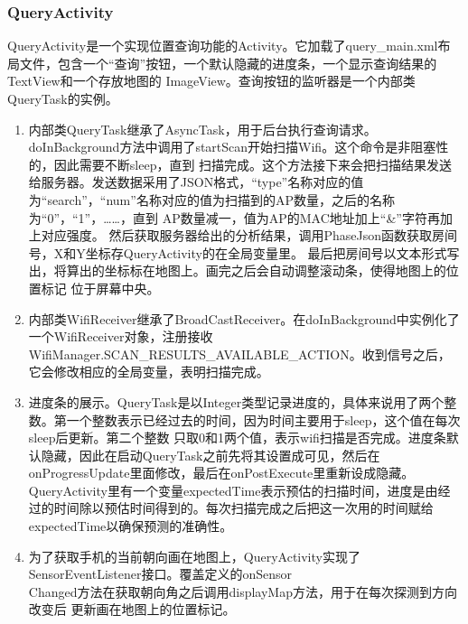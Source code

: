 \documentclass[a4paper,10pt]{article}
\begin{document}
\begin{CJK*}{UTF8}{gbsn}
    \subsubsection{QueryActivity}
    QueryActivity是一个实现位置查询功能的Activity。它加载了query\_main.xml布局文件，包含一个``查询''按钮，一个默认隐藏的进度条，一个显示查询结果的TextView和一个存放地图的
    ImageView。查询按钮的监听器是一个内部类QueryTask的实例。
    \begin{enumerate}[1)]
     \item 内部类QueryTask继承了AsyncTask，用于后台执行查询请求。doInBackground方法中调用了startScan开始扫描Wifi。这个命令是非阻塞性的，因此需要不断sleep，直到
     扫描完成。这个方法接下来会把扫描结果发送给服务器。发送数据采用了JSON格式，``type''名称对应的值为``search''，``num''名称对应的值为扫描到的AP数量，之后的名称为``0''，``1''，……，直到
     AP数量减一，值为AP的MAC地址加上``\&''字符再加上对应强度。
     然后获取服务器给出的分析结果，调用PhaseJson函数获取房间号，X和Y坐标存QueryActivity的在全局变量里。
     最后把房间号以文本形式写出，将算出的坐标标在地图上。画完之后会自动调整滚动条，使得地图上的位置标记
     位于屏幕中央。
     \item 内部类WifiReceiver继承了BroadCastReceiver。在doInBackground中实例化了一个WifiReceiver对象，注册接收WifiManager.SCAN\_RESULTS\_AVAILABLE\_ACTION。收到信号之后，
     它会修改相应的全局变量，表明扫描完成。
     \item 进度条的展示。QueryTask是以Integer类型记录进度的，具体来说用了两个整数。第一个整数表示已经过去的时间，因为时间主要用于sleep，这个值在每次sleep后更新。第二个整数
     只取0和1两个值，表示wifi扫描是否完成。进度条默认隐藏，因此在启动QueryTask之前先将其设置成可见，然后在onProgressUpdate里面修改，最后在onPostExecute里重新设成隐藏。
     QueryActivity里有一个变量expectedTime表示预估的扫描时间，进度是由经过的时间除以预估时间得到的。每次扫描完成之后把这一次用的时间赋给expectedTime以确保预测的准确性。
     \item 为了获取手机的当前朝向画在地图上，QueryActivity实现了SensorEventListener接口。覆盖定义的onSensor\\
     Changed方法在获取朝向角之后调用displayMap方法，用于在每次探测到方向改变后
     更新画在地图上的位置标记。
    \end{enumerate}


\end{CJK*}
\end{document}
